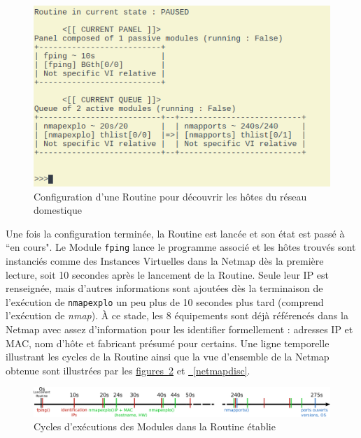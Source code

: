 \documentclass[]{article}
\newcommand{\wordlink}[2]{\hyperref[#1]{#2~\ref{#1}}}
\begin{document}
\vspace{0.2cm}

\begin{figure}[!ht]
\centering
     \includegraphics[width=0.6\linewidth]{routineDisc}
     \caption{Configuration d'une Routine pour découvrir les hôtes du réseau domestique}
     \label{routinedisc}
\end{figure}

\vspace{0.3cm}

\newpage

\par Une fois la configuration terminée, la Routine est lancée et son état est passé à ``en cours". Le Module \texttt{fping} lance le programme associé et les hôtes trouvés sont instanciés comme des Instances Virtuelles dans la Netmap dès la première lecture, soit 10 secondes après le lancement de la Routine. Seule leur IP est renseignée, mais d'autres informations sont ajoutées dès la terminaison de l'exécution de \texttt{nmapexplo} un peu plus de 10 secondes plus tard (comprend l'exécution de \textit{nmap}). À ce stade, les 8 équipements sont déjà référencés dans la Netmap avec assez d'information pour les identifier formellement : adresses IP et MAC, nom d'hôte et fabricant présumé pour certains. Une ligne temporelle illustrant les cycles de la Routine ainsi que la vue d'ensemble de la Netmap obtenue sont illustrées par les \wordlink{timeline}{figures} et \wordlink{netmapdisc}{}.

\begin{figure}[!ht]
\centering
     \includegraphics[width=\linewidth]{timeline}
     \caption{Cycles d'exécutions des Modules dans la Routine établie}
     \label{timeline}
\end{figure}

\vspace{0.3cm}
\end{document}
